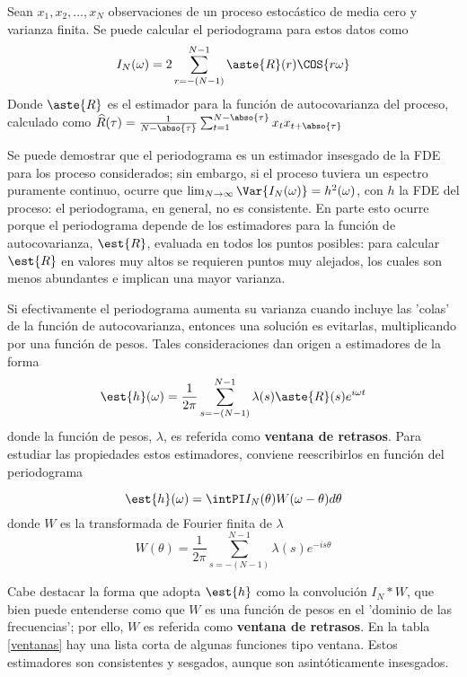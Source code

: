 \begin{teorema}
Sean $x_1, x_2 , \dots, x_N$ observaciones de un proceso estocástico de media cero y varianza
finita. Se puede calcular el periodograma para estos datos como
\begin{equation*}
I_N(\omega) = 2 \sum_{r = -(N-1)}^{N-1} \aste{R}(r) \COS{r \omega}
\end{equation*}
Donde $\aste{R}$ es el estimador para la función de autocovarianza del proceso, calculado como
$\widehat{R}(\tau) = \frac{1}{N-\abso{\tau}} \sum_{t = 1}^{N-\abso{\tau}} x_t x_{t+\abso{\tau}}$
\label{periodograma_rho}
\end{teorema}

Se puede demostrar que el periodograma es un estimador insesgado de la FDE para los proceso 
considerados; sin embargo, si el proceso tuviera un espectro puramente continuo, ocurre que 
$\lim_{N\rightarrow \infty} \Var{I_N(\omega)} = h^{2}(\omega)$, con $h$ la FDE del proceso: el 
periodograma, en general, no es consistente.
En parte esto ocurre porque el periodograma depende de los estimadores para la función de 
autocovarianza, $\est{R}$, evaluada en todos los puntos posibles: para calcular $\est{R}$ en 
valores muy altos se requieren puntos muy alejados, los cuales son menos abundantes e implican 
una mayor varianza.

Si efectivamente el periodograma aumenta su varianza cuando incluye las 'colas' de la función de 
autocovarianza, entonces una solución es evitarlas, multiplicando por una función de pesos. 
Tales consideraciones dan origen a estimadores de la forma
\begin{equation*}
\est{h}(\omega) = \frac{1}{2\pi} \sum_{s = -(N-1)}^{N-1} 
\lambda(s) \aste{R}(s) e^{i \omega t}
\label{ventaneando}
\end{equation*}
donde la función de pesos, $\lambda$, es referida como \textbf{ventana de retrasos}. Para 
estudiar las propiedades estos estimadores, conviene reescribirlos en función del periodograma

\begin{equation*}
\est{h}(\omega) = \intPI I_N(\theta) W(\omega-\theta) d\theta
\end{equation*}
donde $W$ es la transformada de Fourier finita de $\lambda$
\begin{equation*}
W(\theta) = \frac{1}{2\pi} \sum_{s = -(N-1)}^{N-1} \lambda(s) e^{-is\theta}
\end{equation*}

Cabe destacar la forma que adopta $\est{h}$ como la convolución $I_N \ast W$, que bien puede 
entenderse como que $W$ es una función de pesos en el 'dominio de las frecuencias'; por ello, $W$ 
es referida como \textbf{ventana de retrasos}.
En la tabla \ref{ventanas} hay una lista corta de algunas funciones tipo ventana. Estos estimadores 
son consistentes y sesgados, aunque son asintóticamente insesgados.

